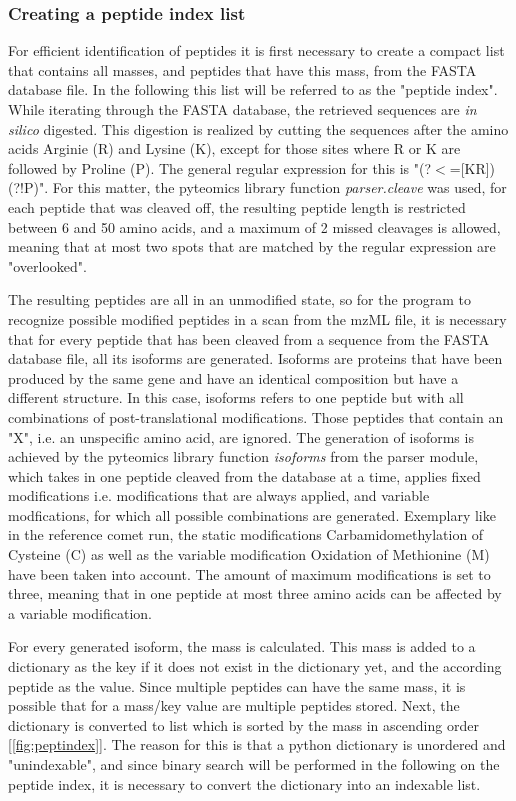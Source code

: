 \documentclass[11pt]{article}
\begin{document}
\subsubsection{Creating a peptide index list}
For efficient identification of peptides it is first necessary to create a compact list that contains all masses, and peptides that have this mass, from the FASTA database file. In the following this list will be referred to as the "peptide index". While iterating through the FASTA database, the retrieved sequences are \textit{in silico} digested. This digestion is realized by cutting the sequences after the amino acids Arginie (R) and Lysine (K), except for those sites where R or K are followed by Proline (P). The general regular expression for this is "(?$<$=[KR])(?!P)". For this matter, the pyteomics library function \textit{parser.cleave} was used, for each peptide that was cleaved off, the resulting peptide length is restricted between 6 and 50 amino acids, and a maximum of 2 missed cleavages is allowed, meaning that at most two spots that are matched by the regular expression are "overlooked". 

The resulting peptides are all in an unmodified state, so for the program to recognize possible modified peptides in a scan from the mzML\cite{mzml} file, it is necessary that for every peptide that has been cleaved from a sequence from the FASTA database file, all its isoforms are generated. Isoforms are proteins that have been produced by the same gene and have an identical composition but have a different structure. In this case, isoforms refers to one peptide but with all combinations of post-translational modifications. Those peptides that contain an "X", i.e. an unspecific amino acid, are ignored. The generation of isoforms is achieved by the pyteomics library function \textit{isoforms} from the parser module, which takes in one peptide cleaved from the database at a time, applies fixed modifications i.e. modifications that are always applied, and variable modfications, for which all possible combinations are generated. Exemplary like in the reference comet run, the static modifications Carbamidomethylation of Cysteine (C) as well as the variable modification Oxidation of Methionine (M) have been taken into account. The amount of maximum modifications is set to three, meaning that in one peptide at most three amino acids can be affected by a variable modification.

For every generated isoform, the mass is calculated. This mass is added to a dictionary as the key if it does not exist in the dictionary yet, and the according peptide as the value. Since multiple peptides can have the same mass, it is possible that for a mass/key value are multiple peptides stored. Next, the dictionary is converted to list which is sorted by the mass in ascending order [\cref{fig:peptindex}]. The reason for this is that a python dictionary is unordered and "unindexable", and since binary search will be performed in the following on the peptide index, it is necessary to convert the dictionary into an indexable list.
 
\end{document}
